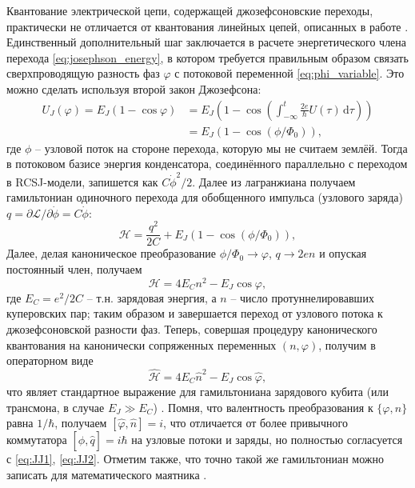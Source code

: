 \documentclass[14pt, a4paper]{extreport}
\newcommand{\diff}{\,\mathrm{d}}
\numberwithin{equation}{section}
\begin{document}
Квантование электрической цепи, содержащей джозефсоновские переходы, практически не отличается от квантования линейных цепей, описанных в работе \cite{devoret1995quantum}. Единственный дополнительный шаг заключается в расчете энергетического члена перехода \eqref{eq:josephson_energy}, в котором требуется правильным образом связать сверхпроводящую разность фаз $\varphi$ с потоковой переменной \eqref{eq:phi_variable}. Это можно сделать используя второй закон Джозефсона:
\begin{equation}
\begin{aligned}
	U_J(\varphi) = E_J (1-\cos\varphi) &= E_J\left(1 - \cos \left( \int_{-\infty}^{t} \frac{2e}{\hbar} U(\tau) \diff\tau\right)\right)\\
	&= E_J \left( 1 - \cos \left(\phi/\Phi_0\right)\right),
\end{aligned}
\end{equation}
где $\phi$ -- узловой поток на стороне перехода, которую мы не считаем землёй. Тогда в потоковом базисе энергия конденсатора, соединённого параллельно с переходом в RCSJ-модели, запишется как $C\dot\phi^2/2$. Далее из лагранжиана получаем гамильтониан одиночного перехода для обобщенного импульса (узлового заряда) $q = \partial \mathcal L / \partial \dot \phi = C \dot \phi$:
\begin{equation}
	\mathcal H = \frac{q^2}{2C} + E_J (1 - \cos (\phi/\Phi_0)),
\end{equation}
Далее, делая каноническое преобразование $\phi / \Phi_0\rightarrow  \varphi$, $q \rightarrow 2en$ и опуская постоянный член, получаем
\begin{equation}
{\mathcal{H}} = 4 E_C n^2  - E_J \cos \varphi,
\end{equation}
где $E_C = e^2/2C$ -- т.н. зарядовая энергия, а $n$ -- число протуннелировавших куперовских пар; таким образом и завершается переход от узлового потока к джозефсоновской разности фаз. Теперь, совершая процедуру канонического квантования на канонически сопряженных переменных $(n, \varphi)$, получим в операторном виде
\begin{equation}
\hat{\mathcal H}  =  4 E_C \hat n^2  - E_J \cos \hat \varphi,\label{eq:transmon_hamiltonian}
\end{equation}
что являет стандартное выражение для гамильтониана зарядового кубита (или трансмона, в случае $E_J \gg E_C$) \cite{koch2007charge}. Помня, что валентность преобразования к $\{\varphi, n\}$ равна $1/\hbar$, получаем  $ [\hat \varphi, \hat n] = i $, что отличается от более привычного коммутатора $ [\hat\phi, \hat q] = i\hbar $ на узловые потоки и заряды, но полностью согласуется с \eqref{eq:JJ1}, \eqref{eq:JJ2}. Отметим также, что точно такой же гамильтониан можно записать для математического маятника \cite{koch2007charge}.
\end{document}
